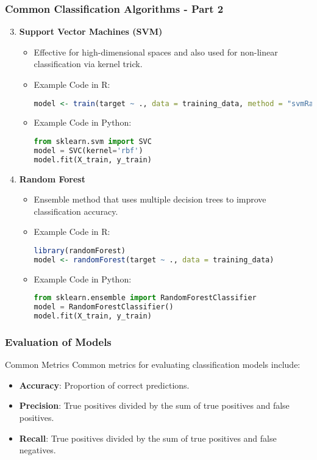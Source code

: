 \documentclass{beamer}
\begin{document}
\begin{frame}[fragile]
    \frametitle{Common Classification Algorithms - Part 2}
    \begin{enumerate}
        \setcounter{enumi}{2} %
        \item \textbf{Support Vector Machines (SVM)}
        \begin{itemize}
            \item Effective for high-dimensional spaces and also used for non-linear classification via kernel trick.
            \item Example Code in R:
            \begin{lstlisting}[language=R]
model <- train(target ~ ., data = training_data, method = "svmRadial")
            \end{lstlisting}
            \item Example Code in Python:
            \begin{lstlisting}[language=Python]
from sklearn.svm import SVC
model = SVC(kernel='rbf')
model.fit(X_train, y_train)
            \end{lstlisting}
        \end{itemize}

        \item \textbf{Random Forest}
        \begin{itemize}
            \item Ensemble method that uses multiple decision trees to improve classification accuracy.
            \item Example Code in R:
            \begin{lstlisting}[language=R]
library(randomForest)
model <- randomForest(target ~ ., data = training_data)
            \end{lstlisting}
            \item Example Code in Python:
            \begin{lstlisting}[language=Python]
from sklearn.ensemble import RandomForestClassifier
model = RandomForestClassifier()
model.fit(X_train, y_train)
            \end{lstlisting}
        \end{itemize}
    \end{enumerate}
\end{frame}

\begin{frame}[fragile]
    \frametitle{Evaluation of Models}
    \begin{block}{Common Metrics}
        Common metrics for evaluating classification models include:
        \begin{itemize}
            \item \textbf{Accuracy}: Proportion of correct predictions.
            \item \textbf{Precision}: True positives divided by the sum of true positives and false positives.
            \item \textbf{Recall}: True positives divided by the sum of true positives and false negatives.
        \end{itemize}
    \end{block}
\end{frame}
\end{document}
